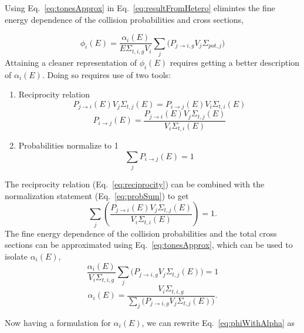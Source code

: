 \documentclass[10pt]{article}
\begin{document}
Using Eq.~\ref{eq:tonesApprox} in Eq.~\ref{eq:resultFromHetero} elimintes the fine energy dependence of the collision probabilities and cross sections,

\begin{equation}\phi_{i}(E)=\frac{\alpha_i(E)}{E\Sigma_{t,i,g}V_i}\sum\limits_j\Big(P_{j\rightarrow i,g}V_{j}\Sigma_{pot,j}\Big)\label{eq:phiWithAlpha}\end{equation}
Attaining a cleaner representation of $\phi_i(E)$ requires getting a better description of $\alpha_i(E)$. Doing so requires use of two tools:
  \begin{enumerate}
    \item Reciprocity relation
      \begin{equation*}P_{j\rightarrow i}(E)V_{j}\Sigma_{t,j}(E)=P_{i\rightarrow j}(E)V_{i}\Sigma_{t,i}(E)\end{equation*}
        \begin{equation}P_{i\rightarrow j}(E)=\frac{P_{j\rightarrow i}(E)V_{j}\Sigma_{t,j}(E)}{V_{i}\Sigma_{t,i}(E)}\label{eq:reciprocity}\end{equation}
    \item Probabilities normalize to 1
      \begin{equation}\sum\limits_{j}P_{i\rightarrow j}(E)=1\label{eq:probSum}\end{equation}
  \end{enumerate}


The reciprocity relation (Eq.~\ref{eq:reciprocity}) can be combined with the normalization statement (Eq.~\ref{eq:probSum}) to get
\begin{equation}\sum\limits_{j}\left(\frac{P_{j\rightarrow i}(E)V_{j}\Sigma_{t,j}(E)}{V_{i}\Sigma_{t,i}(E)}\right)=1.\end{equation}
The fine energy dependence of the collision probabilities and the total cross sections can be approximated using Eq.~\ref{eq:tonesApprox}, which can be used to isolate $\alpha_i(E)$,
\begin{equation}\frac{\alpha_i(E)}{V_i\Sigma_{t,i,g}}\sum\limits_{j}\Big(P_{j\rightarrow i,g}V_{j}\Sigma_{t,j}(E)\Big)=1\end{equation}
\begin{equation}\alpha_i(E)=\frac{V_i\Sigma_{t,i,g}}{\sum\limits_{j}\Big(P_{j\rightarrow i,g}V_{j}\Sigma_{t,j}(E)\Big)}.\end{equation}



Now having a formulation for $\alpha_i(E)$, we can rewrite Eq.~\ref{eq:phiWithAlpha} as
\end{document}
